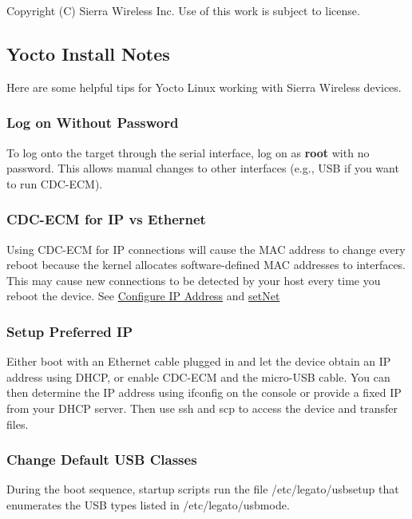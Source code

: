 Copyright (C) Sierra Wireless Inc. Use of this work is subject to license. \hypertarget{yoctoInstallNotes}{}\subsection{Yocto Install Notes}\label{yoctoInstallNotes}
Here are some helpful tips for Yocto Linux working with Sierra Wireless devices.\hypertarget{yocto_install_notes_getstartedInstallNotes_yoctoNoPwd}{}\subsubsection{Log on Without Password}\label{yocto_install_notes_getstartedInstallNotes_yoctoNoPwd}
To log onto the target through the serial interface, log on as {\bfseries root} with no password. This allows manual changes to other interfaces (e.\+g., U\+S\+B if you want to run C\+D\+C-\/\+E\+C\+M).\hypertarget{yocto_install_notes_getstartedInstallNotes_yoctoCDC}{}\subsubsection{C\+D\+C-\/\+E\+C\+M for I\+P vs Ethernet}\label{yocto_install_notes_getstartedInstallNotes_yoctoCDC}
Using C\+D\+C-\/\+E\+C\+M for I\+P connections will cause the M\+A\+C address to change every reboot because the kernel allocates software-\/defined M\+A\+C addresses to interfaces. This may cause new connections to be detected by your host every time you reboot the device. See \hyperlink{getstartedConfigIP}{Configure I\+P Address} and \hyperlink{toolsTarget_setNet}{set\+Net}\hypertarget{yocto_install_notes_getstartedInstallNotes_yoctoPrefIP}{}\subsubsection{Setup Preferred I\+P}\label{yocto_install_notes_getstartedInstallNotes_yoctoPrefIP}
Either boot with an Ethernet cable plugged in and let the device obtain an I\+P address using D\+H\+C\+P, or enable C\+D\+C-\/\+E\+C\+M and the micro-\/\+U\+S\+B cable. You can then determine the I\+P address using {\ttfamily ifconfig} on the console or provide a fixed I\+P from your D\+H\+C\+P server. Then use {\ttfamily ssh} and {\ttfamily scp} to access the device and transfer files.\hypertarget{yocto_install_notes_getstartedInstallNotes_yoctoDefUSB}{}\subsubsection{Change Default U\+S\+B Classes}\label{yocto_install_notes_getstartedInstallNotes_yoctoDefUSB}
During the boot sequence, startup scripts run the file {\ttfamily /etc/legato/usbsetup} that enumerates the U\+S\+B types listed in {\ttfamily /etc/legato/usbmode}.

